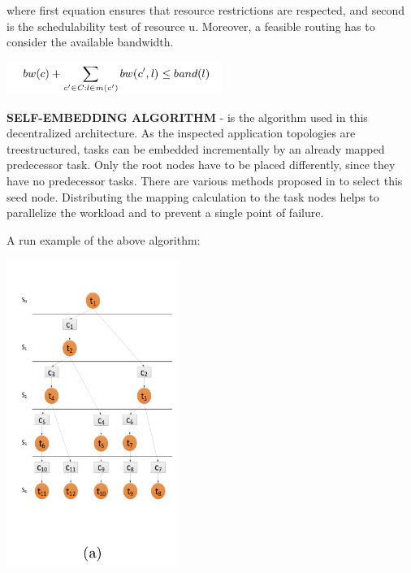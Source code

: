 where first equation ensures that resource restrictions are respected,
and second is the schedulability test of resource u. Moreover, a feasible
routing has to consider the available bandwidth.

\includegraphics[width=7cm]{images/10}

\textbf{SELF-EMBEDDING ALGORITHM} - is the algorithm used in this
decentralized architecture. As the inspected application topologies
are treestructured, tasks can be embedded incrementally by an already
mapped predecessor task. Only the root nodes have to be placed differently,
since they have no predecessor tasks. There are various methods proposed
in \cite{Weichslgartner:2011:DDM:1999946.1999979} to select this
seed node. Distributing the mapping calculation to the task nodes
helps to parallelize the workload and to prevent a single point of
failure. 

A run example of the above algorithm:

\includegraphics[height=10cm]{images/11}

